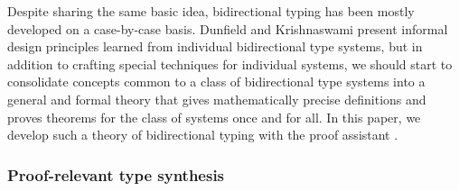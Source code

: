 
Despite sharing the same basic idea, bidirectional typing has been mostly developed on a case-by-case basis.
Dunfield and Krishnaswami present informal design principles learned from individual bidirectional type systems, but in addition to crafting special techniques for individual systems, we should start to consolidate concepts common to a class of bidirectional type systems into a general and formal theory that gives mathematically precise definitions and proves theorems for the class of systems once and for all.
In this paper, we develop such a theory of bidirectional typing with the proof assistant \Agda.

\subsubsection{Proof-relevant type synthesis}
\label{sec:PLFA}

